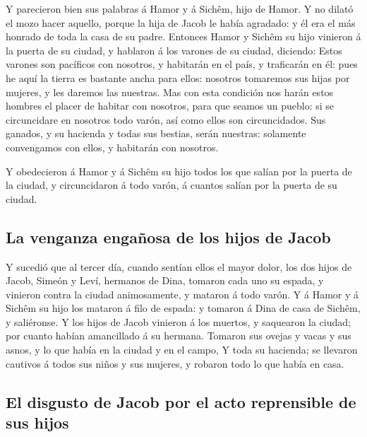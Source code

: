  Y parecieron bien sus palabras á Hamor y á Sichêm, hijo de
Hamor.  Y no dilató el mozo hacer aquello, porque la hija
de Jacob le había agradado: y él era el más honrado de toda la casa de
su padre.  Entonces Hamor y Sichêm su hijo vinieron á la
puerta de su ciudad, y hablaron á los varones de su ciudad, diciendo:
 Estos varones son pacíficos con nosotros, y habitarán en
el país, y traficarán en él: pues he aquí la tierra es bastante ancha
para ellos: nosotros tomaremos sus hijas por mujeres, y les daremos las
nuestras.  Mas con esta condición nos harán estos hombres
el placer de habitar con nosotros, para que seamos un pueblo: si se
circuncidare en nosotros todo varón, así como ellos son circuncidados.
 Sus ganados, y su hacienda y todas sus bestias, serán
nuestras: solamente convengamos con ellos, y habitarán con nosotros.

 Y obedecieron á Hamor y á Sichêm su hijo todos los que
salían por la puerta de la ciudad, y circuncidaron á todo varón, á
cuantos salían por la puerta de su ciudad.

\hypertarget{la-venganza-engauxf1osa-de-los-hijos-de-jacob}{%
\subsection{La venganza engañosa de los hijos de
Jacob}\label{la-venganza-engauxf1osa-de-los-hijos-de-jacob}}

 Y sucedió que al tercer día, cuando sentían ellos el mayor
dolor, los dos hijos de Jacob, Simeón y Leví, hermanos de Dina, tomaron
cada uno su espada, y vinieron contra la ciudad animosamente, y mataron
á todo varón.  Y á Hamor y á Sichêm su hijo los mataron á
filo de espada: y tomaron á Dina de casa de Sichêm, y saliéronse.
 Y los hijos de Jacob vinieron á los muertos, y saquearon
la ciudad; por cuanto habían amancillado á su hermana. 
Tomaron sus ovejas y vacas y sus asnos, y lo que había en la ciudad y en
el campo,  Y toda su hacienda; se llevaron cautivos á todos
sus niños y sus mujeres, y robaron todo lo que había en casa.

\hypertarget{el-disgusto-de-jacob-por-el-acto-reprensible-de-sus-hijos}{%
\subsection{El disgusto de Jacob por el acto reprensible de sus
hijos}\label{el-disgusto-de-jacob-por-el-acto-reprensible-de-sus-hijos}}

